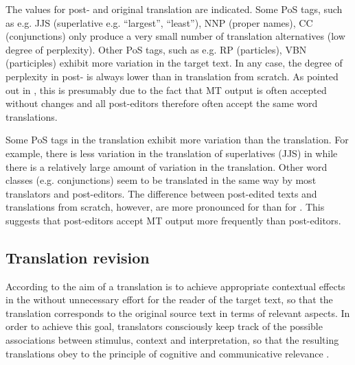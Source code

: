 \documentclass[output=paper]{LSP/langsci}
\begin{document}
The values for post- and original translation are indicated. Some PoS tags, such as e.g. JJS (superlative e.g. ``largest'', ``least''), NNP (proper names), CC (conjunctions) only produce a very small number of translation alternatives (low degree of perplexity). Other PoS tags, such as e.g. RP (particles), VBN (participles) exhibit more variation in the target text. In any case, the degree of  perplexity in post- is always lower than in translation from scratch. As pointed out in , this is presumably due to the fact that MT output is often accepted without changes and all post-editors therefore often accept the same word translations.

Some PoS tags in the  translation exhibit more variation than the  translation. For example, there is less variation in the translation of superlatives (JJS) in  while there is a relatively large amount of variation in the  translation. Other word classes (e.g. conjunctions) seem to be translated in the same way by most translators and post-editors. The difference between post-edited texts and translations from scratch, however, are more pronounced for  than for . This suggests that  post-editors accept MT output more frequently than  post-editors. 


\subsection{Translation revision}
\label{carl-schaeffer:sec:4.4}

According to \citet{Gutt1991} the aim of a translation is to achieve appropriate contextual effects in the  without unnecessary effort for the reader of the target text, so that the translation corresponds to the original source text in terms of relevant aspects. In order to achieve this goal, translators consciously keep track of the possible associations between stimulus, context and interpretation, so that the resulting translations obey to the principle of cognitive and communicative relevance \citep[260]{Sperber1995}.
\end{document}
